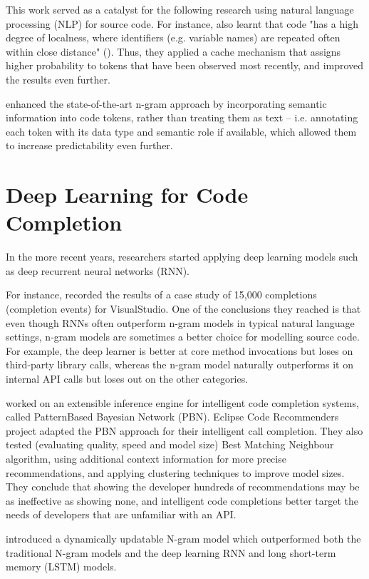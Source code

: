 This work served as a catalyst for the following research using natural language processing (NLP) for source code. For instance, \cite{Tu14a} also learnt that code "has a high degree of localness, where identifiers (e.g. variable names) are repeated often within close distance" (\cite{Alla18a}). Thus, they applied a cache mechanism that assigns higher probability to tokens that have been observed most recently, and improved the results even further.

\cite{Nguy13a} enhanced the state-of-the-art n-gram approach by incorporating semantic information into code tokens, rather than treating them as text -- i.e. annotating each token with its data type and semantic role if available, which allowed them to increase predictability even further.

\section{Deep Learning for Code Completion}
\label{sec:RelatedWorks-DeepLearning}
In the more recent years, researchers started applying deep learning models such as deep recurrent neural networks (RNN).

For instance, \cite{Hell19a} recorded the results of a case study of 15,000 completions (completion events) for VisualStudio. One of the conclusions they reached is that even though RNNs often outperform n-gram models in typical natural language settings, n-gram models are sometimes a better choice for modelling source code. For example, the deep learner is better at core method invocations but loses on third-party library calls, whereas the n-gram model naturally outperforms it on internal API calls but loses out on the other categories.

\cite{Prok15a} worked on an extensible inference engine for intelligent code completion systems, called PatternBased Bayesian Network (PBN). Eclipse Code Recommenders project adapted the PBN approach for their intelligent call completion. They also tested (evaluating quality, speed and model size) Best Matching Neighbour algorithm, using additional context information for more precise recommendations, and applying clustering techniques to improve model sizes. They conclude that showing the developer hundreds of recommendations may be as ineffective as showing none, and intelligent code completions better target the needs of developers that are unfamiliar with an API.

\cite{Hell17a} introduced a dynamically updatable N-gram model which outperformed both the traditional N-gram models and the deep learning RNN and long short-term memory (LSTM) models.

